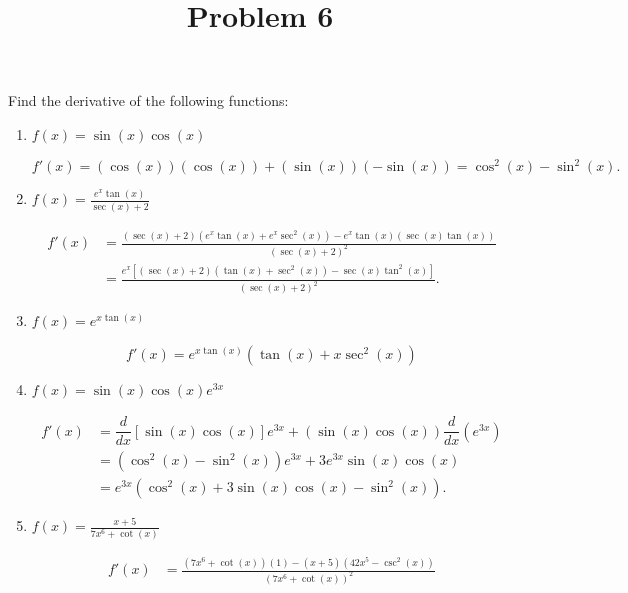 \documentclass{ximera}
\title[Problem 6]{Problem 6}
\begin{document}
\begin{abstract} \end{abstract}
\maketitle


\begin{problem}
Find the derivative of the following functions:

	\begin{enumerate}
	\item  $f(x) = \sin(x) \cos(x)$
			\begin{explanation}
			$$f'(x) = (\cos(x))(\cos(x)) + (\sin(x))(-\sin(x)) = \cos^2(x) - \sin^2(x).$$
			\end{explanation}			
\item  $f(x) = \frac{e^x \tan(x)}{\sec(x) + 2}$
			\begin{explanation}
			\begin{align*}
			f'(x) &= \frac{(\sec(x)+2)(e^x \tan(x) + e^x \sec^2(x)) - e^x \tan(x) (\sec(x) \tan(x))}{(\sec(x) + 2)^2}  \\
			&= \frac{e^x[(\sec(x) + 2)(\tan(x) + \sec^2(x)) - \sec(x) \tan^2(x)]}{(\sec(x) + 2)^2}.
			\end{align*}
			\end{explanation}
\item  $f(x) = e^{x \tan(x)}$
			\begin{explanation}
			\[	
			f'(x) = e^{x \tan(x)}\left(\tan{(x)}+x\sec^{2}(x)\right) 
		         \]
			\end{explanation}			
\item  $f(x) = \sin(x) \cos(x) e^{3x}$
			\begin{explanation}
			\begin{align*}
			f'(x) &= \dfrac{d}{dx}[\sin(x) \cos(x)] e^{3x} + \left(\sin(x) \cos(x)\right) \dfrac{d}{dx}(e^{3x})  \\
			&= \left(\cos^2(x) - \sin^2(x)\right)e^{3x} + 3e^{3x} \sin(x) \cos(x)  \\
			&= e^{3x}\left(\cos^2(x) + 3\sin(x) \cos(x) - \sin^2(x)\right).
			\end{align*}
			\end{explanation}
\item  $f(x) = \frac{x+5}{7x^6 + \cot(x)}$
			\begin{explanation}
			\begin{align*}
			f'(x) &= \frac{(7x^6 + \cot(x))(1) - (x+5)(42x^5 - \csc^2(x))}{(7x^6 + \cot(x))^2}  \\

\end{align*}
\end{explanation}
\end{enumerate}
\end{problem}
\end{document}
